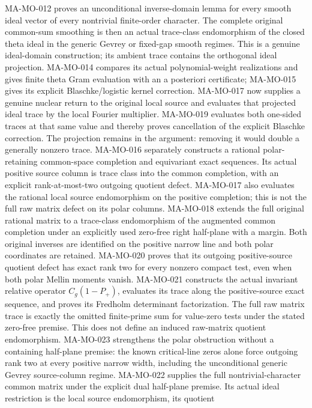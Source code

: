 \documentclass[11pt,a4paper]{article}
\begin{document}
MA-MO-012 proves an unconditional inverse-domain lemma for
every smooth ideal vector of every nontrivial finite-order
character. The complete original common-sum smoothing is then
an actual trace-class endomorphism of the closed theta ideal
in the generic Gevrey or fixed-gap smooth regimes. This is
a genuine ideal-domain construction; its ambient trace contains
the orthogonal ideal projection. MA-MO-014 compares its actual
polynomial-weight realizations and gives finite theta Gram
evaluation with an a posteriori certificate; MA-MO-015 gives
its explicit Blaschke/logistic kernel correction.
MA-MO-017 now supplies a genuine nuclear return to the
original local source and evaluates that projected ideal
trace by the local Fourier multiplier. MA-MO-019 evaluates both
one-sided traces at that same value and thereby proves cancellation
of the explicit Blaschke correction. The projection remains in the
argument: removing it would double a generally nonzero trace.
MA-MO-016 separately constructs a rational
polar-retaining common-space completion and equivariant exact
sequences. Its actual positive source column is trace class
into the common completion, with an explicit rank-at-most-two
outgoing quotient defect. MA-MO-017 also evaluates the rational
local source endomorphism on the positive completion; this
is not the full raw matrix defect on its polar columns.
MA-MO-018 extends the full original rational matrix to a trace-class
endomorphism of the augmented common completion under an explicitly
used zero-free right half-plane with a margin. Both original
inverses are identified on the positive narrow line and both polar
coordinates are retained. MA-MO-020 proves that its outgoing
positive-source quotient defect has exact rank two for every
nonzero compact test, even when both polar Mellin moments vanish.
MA-MO-021 constructs the actual invariant relative operator
\(C_g(1-P_+)\), evaluates its trace along the positive-source
exact sequence, and proves its Fredholm determinant factorization.
The full raw matrix trace is exactly the omitted finite-prime
sum for value-zero tests under the stated zero-free premise.
This does not define an induced raw-matrix quotient endomorphism.
MA-MO-023 strengthens the polar obstruction without a containing
half-plane premise: the known critical-line zeros alone force
outgoing rank two at every positive narrow width, including
the unconditional generic Gevrey source-column regime.
MA-MO-022 supplies the full nontrivial-character common matrix
under the explicit dual half-plane premise. Its actual ideal
restriction is the local source endomorphism, its quotient
\end{document}
